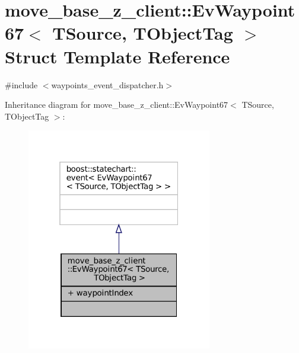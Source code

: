 \hypertarget{structmove__base__z__client_1_1EvWaypoint67}{}\section{move\+\_\+base\+\_\+z\+\_\+client\+:\+:Ev\+Waypoint67$<$ T\+Source, T\+Object\+Tag $>$ Struct Template Reference}
\label{structmove__base__z__client_1_1EvWaypoint67}


{\ttfamily \#include $<$waypoints\+\_\+event\+\_\+dispatcher.\+h$>$}



Inheritance diagram for move\+\_\+base\+\_\+z\+\_\+client\+:\+:Ev\+Waypoint67$<$ T\+Source, T\+Object\+Tag $>$\+:
\nopagebreak
\begin{figure}[H]
\begin{center}
\leavevmode
\includegraphics[width=229pt]{structmove__base__z__client_1_1EvWaypoint67__inherit__graph}
\end{center}
\end{figure}


